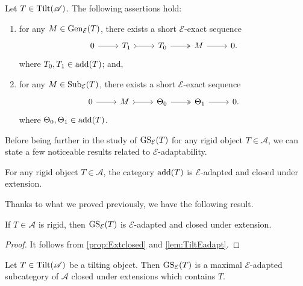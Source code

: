 \begin{prop} \label{prop:GenSubT} Let $T \in \operatorname{Tilt}(\mathscr{A})$. The following assertions hold:
\begin{enumerate}[label=$(\roman*)$, itemsep=1mm]
    \item \label{GenET1} for any $M \in \operatorname{Gen}_\mathcal{E}(T)$, there exists a short $\mathcal{E}$-exact sequence \[\begin{tikzcd}
	 0 & T_1 & T_0 & M&  0.
	\arrow[from=1-1, to=1-2]
	\arrow[tail, from=1-2, to=1-3]
	\arrow[two heads,from=1-3, to=1-4]
	\arrow[from=1-4, to=1-5]
\end{tikzcd}\] where $T_0,T_1 \in \operatorname{add}(T)$; and,
\item \label{SubET1} for any $M \in \operatorname{Sub}_\mathcal{E}(T)$, there exists a short $\mathcal{E}$-exact sequence \[\begin{tikzcd}
	 0 & M & \Theta_0 &  \Theta_1 &  0.
	\arrow[from=1-1, to=1-2]
	\arrow[tail, from=1-2, to=1-3]
	\arrow[two heads,from=1-3, to=1-4]
	\arrow[from=1-4, to=1-5]
\end{tikzcd}\] where $\Theta_0,\Theta_1 \in \operatorname{add}(T)$.
\end{enumerate}   
\end{prop}

Before being further in the study of $\operatorname{GS}_\mathcal{E}(T)$ for any rigid object $T \in \mathscr{A}$, we can state a few noticeable results related to $\mathcal{E}$-adaptability.

\begin{lemma} \label{lem:TiltEadapt}
    For any rigid object $T \in \mathscr{A}$, the category $\operatorname{add}(T)$ is $\mathcal{E}$-adapted and closed under extension.
\end{lemma}

Thanks to what we proved previously, we have the following result.

\begin{cor} \label{cor:rigidEadapt}
    If $T \in \mathscr{A}$ is rigid, then $\operatorname{GS}_{\mathcal{E}}(T)$ is $\mathcal{E}$-adapted and closed under extension.
\end{cor}

\begin{proof}
     It follows from \cref{prop:Extclosed} and \cref{lem:TiltEadapt}.
\end{proof}

\begin{theorem}
\label{thm:maximal}
 Let $T \in \operatorname{Tilt}(\mathscr{A})$ be a tilting object. Then $\operatorname{GS}_\mathcal{E}(T)$ is a maximal $\mathcal{E}$-adapted subcategory of $\mathscr{A}$ closed under extensions which contains $T$.
\end{theorem}

